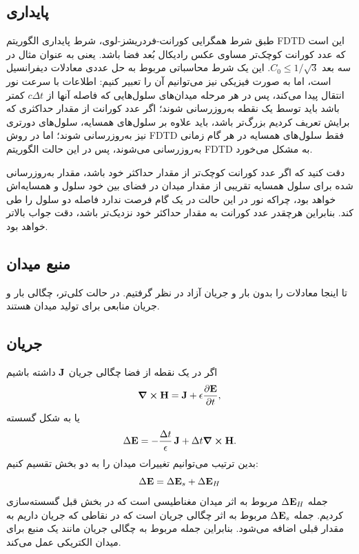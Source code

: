 \documentclass[12pt,a4paper]{article}
\begin{document}
	\subsection{پایداری}
	طبق شرط همگرایی کورانت-فردریشز-لوی، شرط پایداری الگوریتم FDTD این است که
	عدد کورانت کوچک‌تر مساوی عکس رادیکال بُعد فضا باشد. یعنی به عنوان مثال در سه بعد $C_0\le1/\sqrt{3}$.
	این یک شرط محاسباتی مربوط به حل عددی معادلات دیفرانسیل است، اما به صورت فیزیکی نیز می‌توانیم آن را تعبیر کنیم:
	اطلاعات با سرعت نور انتقال پیدا می‌کند، پس در هر مرحله میدان‌های سلول‌هایی که فاصله آنها از $c\Delta{t}$ کمتر باشد باید توسط یک نقطه به‌روزرسانی شوند؛
	اگر عدد کورانت از مقدار حداکثری که برایش تعریف کردیم بزرگ‌تر باشد، باید علاوه بر سلول‌های همسایه، سلول‌های دورتری نیز به‌روزرسانی شوند؛
	اما در روش FDTD فقط سلول‌های همسایه در هر گام زمانی به‌روزرسانی می‌شوند، پس در این حالت الگوریتم FDTD به مشکل می‌خورد.
	
	دقت کنید که اگر عدد کورانت کوچک‌تر از مقدار حداکثر خود باشد، مقدار به‌روزرسانی شده برای سلول همسایه تقریبی از مقدار میدان در فضای بین
	خود سلول و همسایه‌اش خواهد بود، چراکه نور در این حالت در یک گام فرصت ندارد فاصله دو سلول را طی کند.
	بنابراین هرچقدر عدد کورانت به مقدار حداکثر خود نزدیک‌تر باشد، دقت جواب بالاتر خواهد بود.
	\subsection{منبع میدان}
	تا اینجا معادلات را بدون بار و جریان آزاد در نظر گرفتیم. در حالت کلی‌تر، چگالی بار و جریان منابعی برای تولید میدان هستند.
	\subsection{جریان}
	اگر در یک نقطه از فضا چگالی جریان $\vb{J}$ داشته باشیم
	\begin{equation}
		\curl{\vb{H}}=\vb{J}+\epsilon\pdv{\vb{E}}{t},
	\end{equation}
	یا به شکل گسسته
	\begin{equation}
		\Delta{\vb{E}}=-\frac{\Delta{t}}{\epsilon}\,\vb{J}+\Delta{t}\curl{\vb{H}}.
	\end{equation}
	بدین ترتیب می‌توانیم تغییرات میدان را به دو بخش تقسیم کنیم:
	\begin{equation}
		\Delta{\vb{E}}=\Delta{\vb{E}}_s + \Delta{\vb{E}}_H
	\end{equation}
	جمله $\Delta{\vb{E}}_H$ مربوط به اثر میدان مغناطیسی است که در بخش قبل گسسته‌سازی کردیم.
	جمله $\Delta{\vb{E}}_s$ مربوط به اثر چگالی جریان است که در نقاطی که جریان داریم به مقدار قبلی اضافه می‌شود.
	بنابراین جمله مربوط به چگالی جریان مانند یک منبع برای میدان الکتریکی عمل می‌کند.
	
\end{document}

